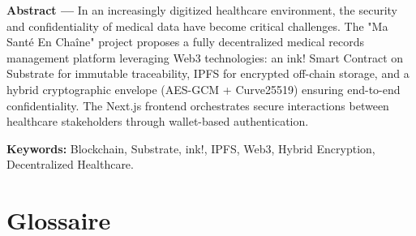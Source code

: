 \documentclass[12pt,a4paper]{report}
\begin{document}
\textbf{Abstract ---} In an increasingly digitized healthcare environment, the security and confidentiality of medical data have become critical challenges. The "Ma Santé En Chaîne" project proposes a fully decentralized medical records management platform leveraging Web3 technologies: an ink! Smart Contract on Substrate for immutable traceability, IPFS for encrypted off-chain storage, and a hybrid cryptographic envelope (AES-GCM + Curve25519) ensuring end-to-end confidentiality. The Next.js frontend orchestrates secure interactions between healthcare stakeholders through wallet-based authentication.

\textbf{Keywords:} Blockchain, Substrate, ink!, IPFS, Web3, Hybrid Encryption, Decentralized Healthcare.

\chapter*{Glossaire}
\end{document}
